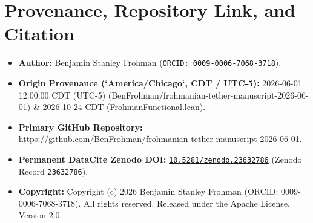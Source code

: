 \documentclass[11pt,letterpaper]{article}
\begin{document}
\section*{Provenance, Repository Link, and Citation}
\begin{itemize}[leftmargin=2em]
  \item \textbf{Author:} Benjamin Stanley Frohman (\texttt{ORCID: 0009-0006-7068-3718}).
  \item \textbf{Origin Provenance (`America/Chicago`, CDT / UTC-5):} 2026-06-01 12:00:00 CDT (UTC-5) (BenFrohman/frohmanian-tether-manuscript-2026-06-01) \& 2026-10-24 CDT (FrohmanFunctional.lean).
  \item \textbf{Primary GitHub Repository:} \url{https://github.com/BenFrohman/frohmanian-tether-manuscript-2026-06-01}.
  \item \textbf{Permanent DataCite Zenodo DOI:} \href{https://doi.org/10.5281/zenodo.23632786}{\texttt{10.5281/zenodo.23632786}} (Zenodo Record \texttt{23632786}).
  \item \textbf{Copyright:} Copyright (c) 2026 Benjamin Stanley Frohman (ORCID: 0009-0006-7068-3718). All rights reserved. Released under the Apache License, Version 2.0.
\end{itemize}
\end{document}
